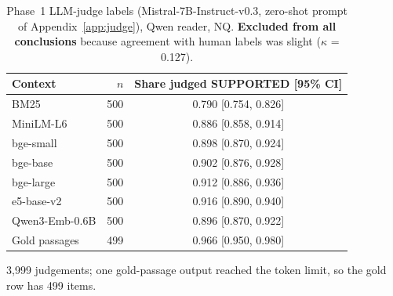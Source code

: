 \begin{table}[t]
\centering
\small
\caption{Phase~1 LLM-judge labels (Mistral-7B-Instruct-v0.3, zero-shot prompt of Appendix~\ref{app:judge}), Qwen reader, NQ. \textbf{Excluded from all conclusions} because agreement with human labels was slight ($\kappa$ = 0.127).}
\label{tab:judgerates}
\begin{tabular}{lrc}
\toprule
Context & $n$ & Share judged SUPPORTED [95\% CI] \\
\midrule
BM25 & 500 & 0.790 [0.754, 0.826] \\
MiniLM-L6 & 500 & 0.886 [0.858, 0.914] \\
bge-small & 500 & 0.898 [0.870, 0.924] \\
bge-base & 500 & 0.902 [0.876, 0.928] \\
bge-large & 500 & 0.912 [0.886, 0.936] \\
e5-base-v2 & 500 & 0.916 [0.890, 0.940] \\
Qwen3-Emb-0.6B & 500 & 0.896 [0.870, 0.922] \\
Gold passages & 499 & 0.966 [0.950, 0.980] \\
\bottomrule
\end{tabular}
\par\smallskip\parbox{\linewidth}{\footnotesize 3,999 judgements; one gold-passage output reached the token limit, so the gold row has 499 items.}
\end{table}
